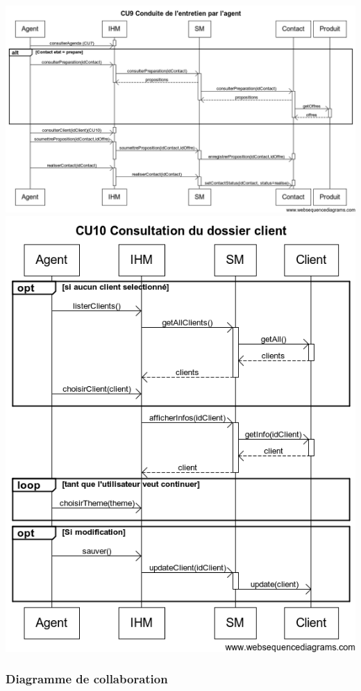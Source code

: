 \begin {center}
\includegraphics[width=\textwidth]{../../webSequenceDiagrameSources/cu9.png}
\includegraphics[width=\textwidth]{../../webSequenceDiagrameSources/cu10.png}
\end {center}

\subsubsection{Diagramme de collaboration}

